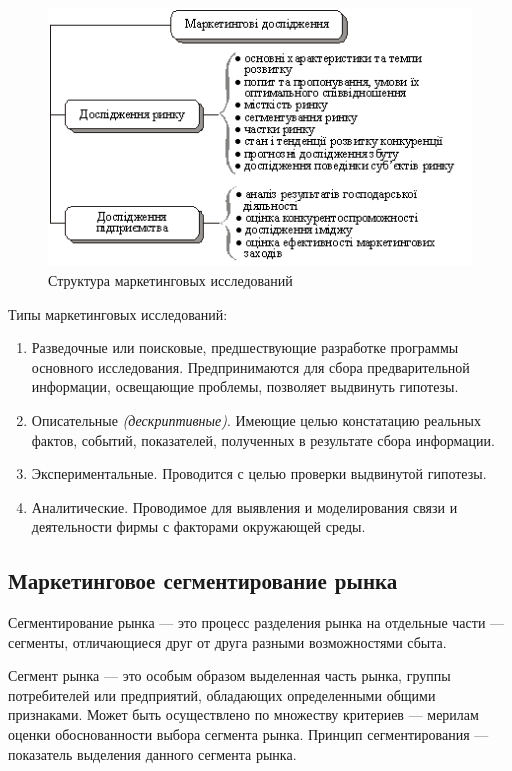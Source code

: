 \documentclass[a4paper,12pt,oneside,final]{extarticle}
\numberwithin{equation}{section}
\begin{document}
\begin{figure}[h]
	\centering
	\includegraphics{management-figures/marketing_structure}
	\caption{Структура маркетинговых исследований}
\end{figure}

Типы маркетинговых исследований:
\begin{enumerate}
	\item Разведочные или поисковые, предшествующие разработке программы основного исследования. 
	Предпринимаются для сбора предварительной информации, освещающие проблемы, позволяет выдвинуть гипотезы.
	\item Описательные \textit{(дескриптивные)}. 
	Имеющие целью констатацию реальных фактов, событий, показателей, полученных в результате сбора информации. 
	\item Экспериментальные. 
	Проводится с целью проверки выдвинутой гипотезы.
	\item Аналитические. 
	Проводимое для выявления и моделирования связи и деятельности фирмы с факторами окружающей среды. 
\end{enumerate}

\subsection{Маркетинговое сегментирование рынка}
Сегментирование рынка --- это процесс разделения рынка на отдельные части --- сегменты, отличающиеся друг от друга разными возможностями сбыта.

Сегмент рынка --- это особым образом выделенная часть рынка, группы потребителей или предприятий, обладающих определенными общими признаками. 
Может быть осуществлено по множеству критериев --- мерилам оценки обоснованности выбора сегмента рынка. 
Принцип сегментирования --- показатель выделения данного сегмента рынка. 
\end{document}
